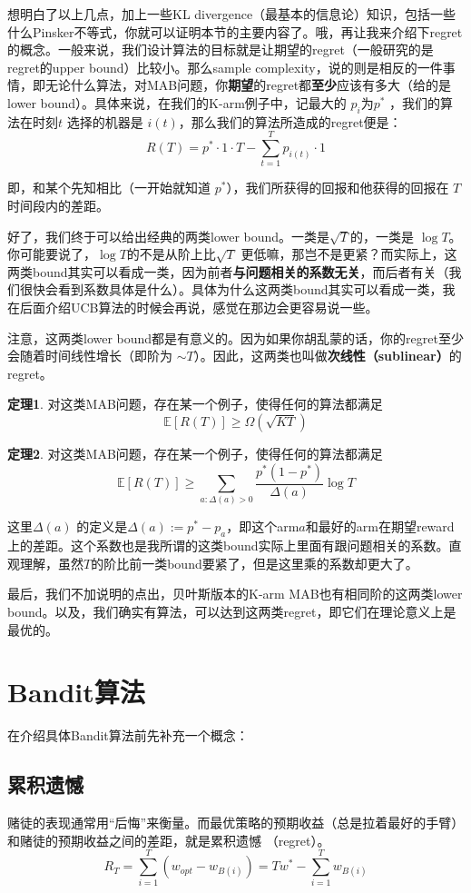 \documentclass[12pt]{article}
\begin{document}
想明白了以上几点，加上一些KL divergence（最基本的信息论）知识，包括一些什么Pinsker不等式，你就可以证明本节的主要内容了。哦，再让我来介绍下regret的概念。一般来说，我们设计算法的目标就是让期望的regret（一般研究的是regret的upper bound）比较小。那么sample complexity，说的则是相反的一件事情，即无论什么算法，对MAB问题，你\textbf{期望}的regret都\textbf{至少}应该有多大（给的是lower bound）。具体来说，在我们的K-arm例子中，记最大的 $p_i$为$p^*$ ，我们的算法在时刻$t$ 选择的机器是 $i(t)$，那么我们的算法所造成的regret便是：
$$
R(T) = p^* \cdot 1 \cdot T - \sum_{t=1}^Tp_{i(t)} \cdot 1
$$

即，和某个先知相比（一开始就知道 $p^*$），我们所获得的回报和他获得的回报在 $T$ 时间段内的差距。

好了，我们终于可以给出经典的两类lower bound。一类是$\sqrt{T}$的，一类是 $\log{T}$。你可能要说了，$\log{T}$的不是从阶上比$\sqrt{T}$ 更低嘛，那岂不是更紧？而实际上，这两类bound其实可以看成一类，因为前者\textbf{与问题相关的系数无关}，而后者有关（我们很快会看到系数具体是什么）。具体为什么这两类bound其实可以看成一类，我在后面介绍UCB算法的时候会再说，感觉在那边会更容易说一些。

注意，这两类lower bound都是有意义的。因为如果你胡乱蒙的话，你的regret至少会随着时间线性增长（即阶为 $\sim T$）。因此，这两类也叫做\textbf{次线性（sublinear）}的regret。

\textbf{定理1}. 对这类MAB问题，存在某一个例子，使得任何的算法都满足
$$
\mathbb{E}[R(T)] \ge \Omega(\sqrt{KT})
$$ 

\textbf{定理2}. 对这类MAB问题，存在某一个例子，使得任何的算法都满足
$$
\mathbb{E}[R(T)] \ge \sum_{a:\Delta(a) > 0} \frac{p^*(1-p^*)}{\Delta(a)}\log{T}
$$

这里$\Delta(a)$ 的定义是$\Delta(a) := p^* - p_a$，即这个arm$a$和最好的arm在期望reward上的差距。这个系数也是我所谓的这类bound实际上里面有跟问题相关的系数。直观理解，虽然$T$的阶比前一类bound要紧了，但是这里乘的系数却更大了。

最后，我们不加说明的点出，贝叶斯版本的K-arm MAB也有相同阶的这两类lower bound。以及，我们确实有算法，可以达到这两类regret，即它们在理论意义上是最优的。


\section{Bandit算法}
在介绍具体Bandit算法前先补充一个概念：

\subsection{累积遗憾}
赌徒的表现通常用“后悔”来衡量。而最优策略的预期收益（总是拉着最好的手臂）和赌徒的预期收益之间的差距，就是累积遗憾
（regret）。
$$
R_T = \sum_{i=1}^T(w_{opt} - w_{B(i)}) = Tw^* - \sum_{i=1}^Tw_{B(i)}
$$
\end{document}
